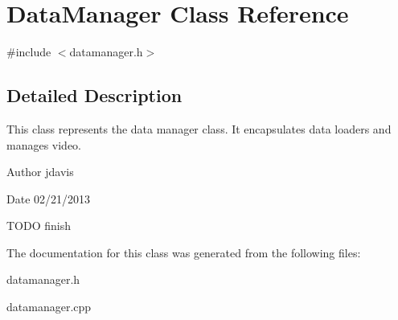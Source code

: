 \hypertarget{classDataManager}{\section{Data\-Manager Class Reference}
\label{classDataManager}
}


{\ttfamily \#include $<$datamanager.\-h$>$}



\subsection{Detailed Description}
This class represents the data manager class. It encapsulates data loaders and manages video.

\begin{DoxyAuthor}{Author}
jdavis 
\end{DoxyAuthor}
\begin{DoxyDate}{Date}
02/21/2013
\end{DoxyDate}
T\-O\-D\-O finish 

The documentation for this class was generated from the following files\-:\begin{DoxyCompactItemize}
\item 
datamanager.\-h\item 
datamanager.\-cpp\end{DoxyCompactItemize}
